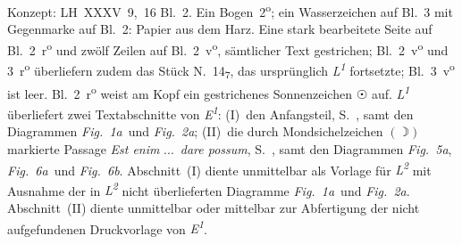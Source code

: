 \begin{ledgroupsized}[r]{114mm}
\footnotesize
\pstart \parindent -6mm
%
%
Konzept: LH~XXXV~9,~16 Bl.~2.
Ein Bogen~2\textsuperscript{o};
ein Wasserzeichen auf Bl.~3 mit Gegenmarke auf Bl.~2: Papier aus dem Harz.
Eine stark bearbeitete Seite auf Bl.~2~r\textsuperscript{o} und zwölf Zeilen auf Bl.~2~v\textsuperscript{o},
sämtlicher Text gestrichen;
Bl.~2~v\textsuperscript{o} und 3~r\textsuperscript{o} überliefern zudem das Stück N.~14\textsubscript{7},
das ursprünglich \textit{L\textsuperscript{1}} fortsetzte;
Bl.~3~v\textsuperscript{o} ist leer.
Bl.~2~r\textsuperscript{o} weist am Kopf ein gestrichenes Sonnenzeichen $\astrosun$ auf.
\textit{L\textsuperscript{1}} überliefert zwei Textabschnitte von \textit{E\textsuperscript{1}}: %
(I)~den Anfangsteil, S.~, samt den Diagrammen \lbrack\textit{Fig.~1a}\rbrack\ und \lbrack\textit{Fig.~2a}\rbrack;
(II)~die durch Mondsichelzeichen $(\rightmoon)$ markierte Passage \textit{Est enim} \lbrack...\rbrack\ \textit{dare possum}, S.~, samt den Diagrammen \lbrack\textit{Fig.~5a}\rbrack, \lbrack\textit{Fig.~6a}\rbrack\ und \lbrack\textit{Fig.~6b}\rbrack.
Abschnitt~(I) diente unmittelbar als Vorlage für \textit{L\textsuperscript{2}} mit Ausnahme der in \textit{L\textsuperscript{2}} nicht überlieferten Diagramme \lbrack\textit{Fig.~1a}\rbrack\ und \lbrack\textit{Fig.~2a}\rbrack.
Abschnitt~(II) diente unmittelbar oder mittelbar zur Abfertigung der nicht aufgefundenen Druckvorlage von \textit{E\textsuperscript{1}}.%
%
\pend
\end{ledgroupsized}
%
